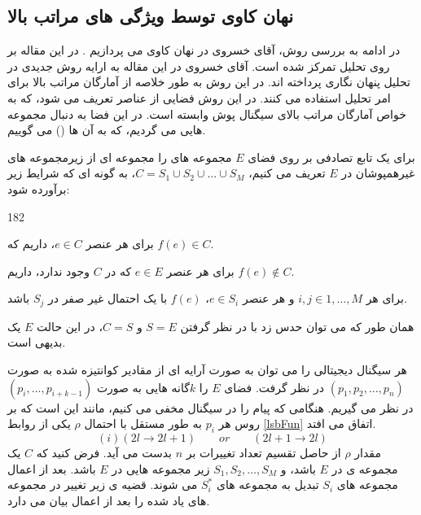 \subsection{نهان کاوی توسط ویژگی های مراتب بالا}
در ادامه به بررسی روش، آقای خسروی در نهان کاوی می پردازیم \cite{Khosravirad2009_Higher}.  در این مقاله بر روی تحلیل  تمرکز شده است. آقای خسروی در این مقاله به ارایه روش جدیدی  در تحلیل پنهان نگاری  پرداخته اند. در این روش به طور خلاصه از آمارگان مراتب بالا برای امر تحلیل استفاده می کنند. در این روش فضایی از عناصر تعریف می شود، که به خواص آمارگان مراتب بالای سیگنال پوش وابسته است. در این فضا به دنبال مجموعه هایی می گردیم، که به آن ها {} () می گوییم. 
\begin{definition}
برای یک تابع تصادفی بر روی فضای $ E $ مجموعه های  را مجموعه ای از زیرمجموعه های غیرهمپوشان در $ E $ تعریف می کنیم، 
{$ C=S_{1}\cup S_{2}\cup \ldots \cup S_{M} $}، به گونه ای که شرایط زیر برآورده شود:
\begin{dingautolist}{182}
\item
برای هر عنصر $ e\in C $، داریم که $ f(e)\in C $.
\item
برای هر عنصر $ e\in E $ که در $ C $ وجود ندارد، داریم $ f(e)\notin C $.

\item
برای هر $ i,j\in {1,\ldots ,M} $  و هر عنصر $ e\in S_{i}$، $ f(e) $ با یک احتمال غیر صفر در $ S_{j} $ باشد. 
\end{dingautolist}
همان طور که می توان حدس زد با در نظر گرفتن $ S=E $ و $ C=S $، در این حالت $ E $ یک  بدیهی است. 
\end{definition}
هر سیگنال دیجیتالی را می توان به صورت آرایه ای از مقادیر کوانتیزه شده به صورت $ (p_{1},p_{2},\ldots ,p_{n}) $ در نظر گرفت. فضای $ E $ را $ k $گانه هایی به صورت $ (p_{i},\ldots ,p_{i+k-1}) $ در نظر می گیریم. هنگامی که پیام را در  سیگنال مخفی می کنیم، مانند این است که بر روس هر $ p_{i} $ به طور مستقل با احتمال $ \rho $ یکی از روابط \ref{lsbFun} اتفاق می افتد.
\begin{equation}
\label{lsbFun}
(i) (2l\longrightarrow 2l+1)\qquad or\qquad (2l+1\longrightarrow 2l)
\end{equation}
مقدار $ \rho $ از حاصل تقسیم تعداد تغییرات  بر $ n $ بدست می آید. فرض کنید که $ C $ یک مجموعه ی  در $ E $ باشد، و $ S_{1},S_{2},\ldots ,S_{M} $ زیر مجموعه هایی در $ E $ باشد. بعد از اعمال  مجموعه های $ S_{i} $ تبدیل به مجموعه های $ S_{i}^{*} $ می شوند. قضیه ی زیر تغییر در {} مجموعه های یاد شده را بعد از اعمال  بیان می دارد.
